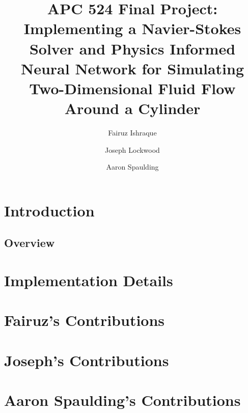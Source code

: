\documentclass[11pt, letterpaper]{article}
\title{\titlefontlarge APC 524 Final Project:\\\titlefont Implementing a Navier-Stokes Solver and Physics Informed Neural Network for Simulating Two-Dimensional Fluid Flow Around a Cylinder}
\author[1]{Fairuz Ishraque}
\author[1]{Joseph Lockwood}
\author[2]{Aaron Spaulding}
\affil[1]{Department of Geosciences}
\affil[2]{Department of Civil and Environmental Engineering}
\date{}
\begin{document}
\maketitle
\newpage 
\tableofcontents

\newpage


\section{Introduction}

\subsection{Overview}


\section{Implementation Details}


\section{Fairuz's Contributions}


\section{Joseph's Contributions}


\section{Aaron Spaulding's Contributions}


\newpage
\printbibliography
\end{document}
